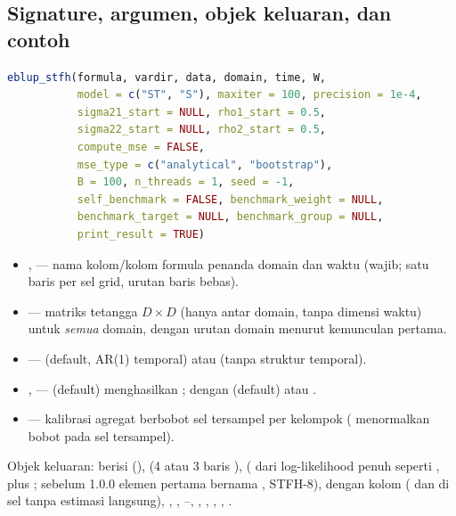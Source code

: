 \subsection{Signature, argumen, objek keluaran, dan contoh}\label{sec:stfh-api}

\begin{lstlisting}[language=R,caption={Signature \texttt{eblup\_stfh} (\texttt{R/eblup\_stfh.R:164-188}).}]
eblup_stfh(formula, vardir, data, domain, time, W,
           model = c("ST", "S"), maxiter = 100, precision = 1e-4,
           sigma21_start = NULL, rho1_start = 0.5,
           sigma22_start = NULL, rho2_start = 0.5,
           compute_mse = FALSE,
           mse_type = c("analytical", "bootstrap"),
           B = 100, n_threads = 1, seed = -1,
           self_benchmark = FALSE, benchmark_weight = NULL,
           benchmark_target = NULL, benchmark_group = NULL,
           print_result = TRUE)
\end{lstlisting}

\begin{itemize}
  \item {},  --- nama kolom/kolom formula penanda domain
        dan waktu (wajib; satu baris per sel grid, urutan baris bebas).
  \item {} --- matriks tetangga $D\times D$ (hanya antar domain, tanpa
        dimensi waktu) untuk \emph{semua} domain, dengan urutan domain menurut
        kemunculan pertama.
  \item {} ---  (default, AR(1) temporal) atau
         (tanpa struktur temporal).
  \item {},  ---  (default)
        menghasilkan ;  dengan 
        (default) atau .
  \item {} --- kalibrasi agregat berbobot sel tersampel
        per kelompok ( menormalkan bobot pada
        sel tersampel).
\end{itemize}

Objek keluaran:  berisi 
(),
 (4 atau 3 baris ), 
( dari log-likelihood penuh seperti
, plus ; sebelum 1.0.0 elemen
pertama bernama , STFH-8), 
dengan kolom  ( dan 
 di sel tanpa estimasi langsung), ,
, --, , ,
, , .

